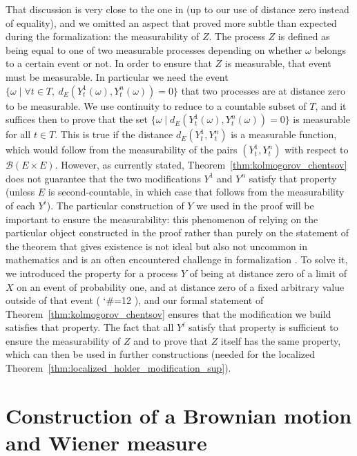 \documentclass[lean]{Draft}
\makeatletter
\newcommand\leanlink{\begingroup\catcode`\#=12\relax\@leanlink}
\newcommand\@leanlink[2]{\endgroup
\href{#1}
{\texttt{\detokenize{#2}}}}
\newcommand{\bmlink}[3]{%
\leanlink{https://github.com/RemyDegenne/brownian-motion/blob/8fd8dc52830cdd07cf9cc8eadd533e284425fa6f/BrownianMotion/#1.lean\##2}
{#3}}
\makeatother
\begin{document}
That discussion is very close to the one in \cite{kratschmer2023kolmogorov} (up to our use of distance zero instead of equality), and we omitted an aspect that proved more subtle than expected during the formalization: the measurability of $Z$.
The process $Z$ is defined as being equal to one of two measurable processes depending on whether $\omega$ belongs to a certain event or not.
In order to ensure that $Z$ is measurable, that event must be measurable.
In particular we need the event $\{\omega \mid \forall t \in T, \: d_E(Y_t^1(\omega), Y_t^n(\omega)) = 0\}$ that two processes are at distance zero to be measurable.
We use continuity to reduce to a countable subset of $T$, and it suffices then to prove that the set $\{\omega \mid d_E(Y_t^1(\omega), Y_t^n(\omega)) = 0\}$ is measurable for all $t \in T$.
This is true if the distance $d_E(Y_t^1, Y_t^n)$ is a measurable function, which would follow from the measurability of the pairs $(Y_t^1, Y_t^n)$ with respect to $\mathcal{B}(E \times E)$.
However, as currently stated, Theorem~\ref{thm:kolmogorov_chentsov} does not guarantee that the two modifications $Y^1$ and $Y^n$ satisfy that property (unless $E$ is second-countable, in which case that follows from the measurability of each $Y^i$).
The particular construction of $Y$ we used in the proof will be important to ensure the measurability: this phenomenon of relying on the particular object constructed in the proof rather than purely on the statement of the theorem that gives existence is not ideal but also not uncommon in mathematics and is an often encountered challenge in formalization \cite{morelTalk}.
To solve it, we introduced the property for a process $Y$ of being at distance zero of a limit of $X$ on an event of probability one, and at distance zero of a fixed arbitrary value outside of that event (\bmlink{Continuity/LimitModification}{L161-L169}{ProbabilityTheory.IsLimitOfIndicator}), and our formal statement of Theorem~\ref{thm:kolmogorov_chentsov} ensures that the modification we build satisfies that property.
The fact that all $Y^i$ satisfy that property is sufficient to ensure the measurability of $Z$ and to prove that $Z$ itself has the same property, which can then be used in further constructions (needed for the localized Theorem~\ref{thm:localized_holder_modification_sup}).



\section{Construction of a Brownian motion and Wiener measure}
\label{S:BM}
\end{document}
